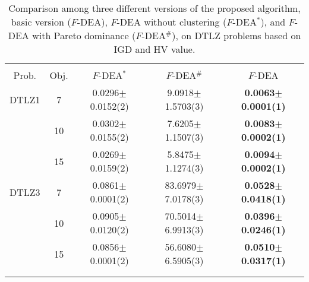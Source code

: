 \begin{table}[]
\centering
\caption{Comparison among three different versions  of the proposed algorithm,  basic version ($F$-DEA), $F$-DEA without clustering ($F$-DEA$^{*}$), and $F$-DEA with Pareto dominance ($F$-DEA$^{\#}$), on DTLZ problems based on IGD and 
HV value.}
\label{table:dtlzigdvariant}
\renewcommand{\arraystretch}{1.1}
\begin{adjustbox}{width=0.50\textwidth,center}
\begin{tabular}{ccccc}
\thickhline
\multicolumn{5}{c}{IGD}\\\thickhline 
Prob. & Obj. & $F$-DEA$^{*}$ & $F$-DEA$^{\#}$ & $F$-DEA                      \\\thickhline
DTLZ1 & 7    & 0.0296$\pm$0.0152(2)  & 9.0918$\pm$1.5703(3)  & \textbf{0.0063$\pm$0.0001(1)} \\
      & 10   & 0.0302$\pm$0.0155(2)  & 7.6205$\pm$1.1507(3)  & \textbf{0.0083$\pm$0.0002(1)} \\
      & 15   & 0.0269$\pm$0.0159(2)  & 5.8475$\pm$1.1274(3)  & \textbf{0.0094$\pm$0.0002(1)} \\\thickhline
DTLZ3 & 7    & 0.0861$\pm$0.0001(2)  & 83.6979$\pm$7.0178(3) & \textbf{0.0528$\pm$0.0418(1)} \\
      & 10   & 0.0905$\pm$0.0120(2)  & 70.5014$\pm$6.9913(3) & \textbf{0.0396$\pm$0.0246(1)} \\
      & 15   & 0.0856$\pm$0.0001(2)  & 56.6080$\pm$6.5905(3) & \textbf{0.0510$\pm$0.0317(1)} \\\thickhline
      \multicolumn{5}{c}{HV}\\\thickhline    

\end{tabular}
\end{adjustbox}
\end{table}
